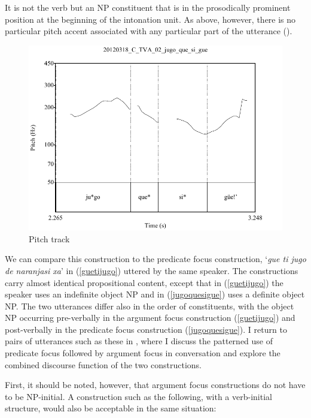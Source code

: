 It is not the verb but an NP constituent that is in the prosodically prominent position at the beginning of the intonation unit. As above, however, there is no particular pitch accent associated with any particular part of the utterance ().


\begin{figure} 
\caption{Pitch track}
\label{fig:5:jugoquesigue}

\includegraphics[height=.4\textheight]{jugoquesigue}
\end{figure}


We can compare this construction to the predicate focus construction, `\textit{gue ti jugo de naranjasi xa}' in (\ref{guetijugo}) uttered by the same speaker. The constructions carry almost identical propositional content, except that in (\ref{guetijugo}) the speaker uses an indefinite object NP and in (\ref{jugoquesigue}) uses a definite object NP. The two utterances differ also in the order of constituents, with the object NP occurring pre-verbally in the argument focus construction (\ref{guetijugo}) and post-verbally in the predicate focus construction (\ref{jugoquesigue}). I return to pairs of utterances such as these in , where I discuss the patterned use of predicate focus followed by argument focus in conversation and explore the combined discourse function of the two constructions. 

First, it should be noted, however, that argument focus constructions do not have to be NP-initial. A construction such as the following, with a verb-initial structure, would also be acceptable in the same situation:

